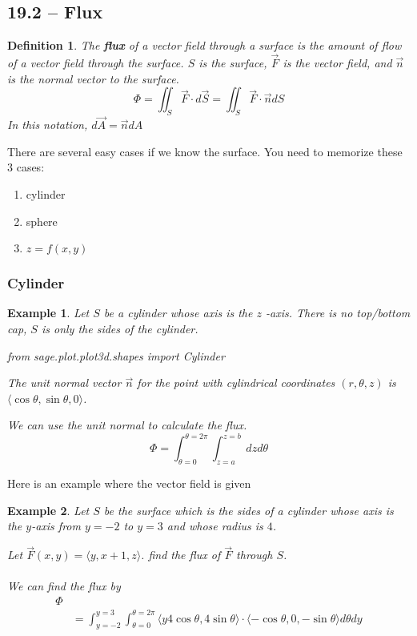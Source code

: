 \documentclass[11pt]{article}
\newtheorem{defn}{Definition}
\newtheorem{ex}{Example}
\begin{document}
\subsection{19.2 -- Flux}
\begin{defn}
  The \textbf{flux} of a vector field through a surface is the amount of flow of a vector field
  through the surface.
  $S$ is the surface, $\vec{F}$ is the vector field, and $\vec{n}$ is the normal vector to the surface.
  \[\Phi = \iint_{S} \vec{F} \cdot d\vec{S} = \iint_{S} \vec{F} \cdot \vec{n} dS\]
  In this notation, $d\vec{A} = \vec{n}dA$
\end{defn}

There are several easy cases if we know the surface.
You need to memorize these $3$ cases:
\begin{enumerate}
  \item cylinder
  \item sphere
        \item $z = f(x,y)$
\end{enumerate}
\subsubsection{Cylinder}
\begin{ex}
  Let $S$ be a cylinder whose axis is the $z$ -axis. There is no top/bottom cap, $S$ is only the
  sides of the cylinder.
  \begin{sageblock}
    from sage.plot.plot3d.shapes import Cylinder
    \end{sageblock}
  The unit normal vector $\vec{n}$ for the point with cylindrical coordinates $(r, \theta, z)$ is
  $\langle \cos \theta, \sin \theta , 0 \rangle$.

  We can use the unit normal to calculate the flux.
  \[\Phi = \int_{\theta = 0}^{\theta = 2\pi} \int_{z=a}^{z=b}   \,dz d\theta\]
\end{ex}

Here is an example where the vector field is given
\begin{ex}
  Let $S$ be the surface which is the sides of a cylinder whose axis is the $y$-axis from
  $y=-2$ to $y=3$ and whose radius is $4$.

  Let $\vec{F}(x,y) = \langle y, x+1, z \rangle $.
  find the flux of $\vec{F}$ through $S$.\\
    \\
  We can find the flux by
  \begin{align*}
    \Phi \\
    &= \int_{y=-2}^{y=3} \int_{\theta = 0}^{\theta = 2\pi} \langle y 4\cos \theta, 4\sin \theta \rangle \cdot \langle -\cos\theta, 0, -\sin\theta \rangle d\theta dy
  \end{align*}
\end{ex}
\end{document}
